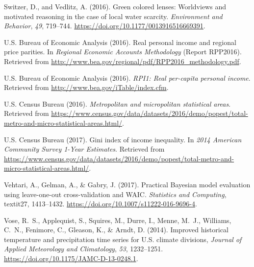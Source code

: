 \documentclass[draft]{agujournal}\usepackage{knitr}
\begin{document}
\begin{thebibliography}{33}
  Switzer, D., and Vedlitz, A. (2016).
  Green colored lenses: Worldviews and motivated reasoning in the case of local
  water scarcity.
  \textit{Environment and Behavior}, \textit{49}, 719--744.
  \url{https://doi.org/10.1177/0013916516669391}.

  U.S. Bureau of Economic Analysis (2016{}).
  Real personal income and regional price parities.
  In \textit{Regional Economic Accounts Methodology\/}
  (Report  RPP2016).
  Retrieved from
  \url{http://www.bea.gov/regional/pdf/RPP2016_methodology.pdf}.

  U.S. Bureau of Economic Analysis (2016{}).
  \textit{{RPI1}: Real per-capita personal income}.
  Retrieved from
  \url{http://www.bea.gov/iTable/index.cfm}.

  U.S. Census Bureau (2016).
  \textit{Metropolitan and micropolitan statistical areas}.
  Retrieved from
  \url{https://www.census.gov/data/datasets/2016/demo/popest/total-metro-and-micro-statistical-areas.html/}.

  {U.S. Census Bureau} (2017).
  Gini index of income inequality.
  In \textit{2014 American Community Survey 1-Year Estimates}.
  Retrieved from
  \url{https://www.census.gov/data/datasets/2016/demo/popest/total-metro-and-micro-statistical-areas.html/}.

  Vehtari, A., Gelman, A., \& Gabry, J. (2017).
  Practical {Bayesian} model evaluation using leave-one-out cross-validation and {WAIC}.
  \textit{Statistics and Computing}, textit{27}, 1413--1432.
  \url{https://doi.org/10.1007/s11222-016-9696-4}.

  Vose, R.~S., Applequist, S., Squires, M., Durre, I., Menne, M.~J., Williams, C.~N.,
  Fenimore, C., Gleason, K., \& Arndt, D. (2014).
  Improved historical temperature and precipitation time series for {U}.{S}.
  climate divisions,
  \textit{Journal of  Applied Meteorology and Climatology}, \textit{53}, 1232--1251.
  \url{https://doi.org/10.1175/JAMC-D-13-0248.1}.


\end{thebibliography}
\end{document}
